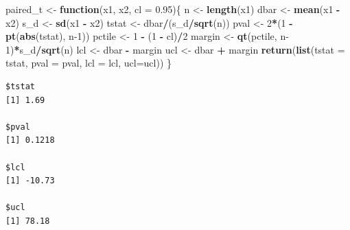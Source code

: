 \documentclass[
]{krantz}
\makeatletter
\newenvironment{Shaded}{\begin{snugshade}}{\end{snugshade}}
\newcommand{\ControlFlowTok}[1]{\textcolor[rgb]{0.27,0.27,0.27}{\textbf{#1}}}
\newcommand{\DataTypeTok}[1]{\textcolor[rgb]{0.27,0.27,0.27}{#1}}
\newcommand{\DecValTok}[1]{\textcolor[rgb]{0.06,0.06,0.06}{#1}}
\newcommand{\FloatTok}[1]{\textcolor[rgb]{0.06,0.06,0.06}{#1}}
\newcommand{\KeywordTok}[1]{\textcolor[rgb]{0.27,0.27,0.27}{\textbf{#1}}}
\newcommand{\NormalTok}[1]{#1}
\newcommand{\OperatorTok}[1]{\textcolor[rgb]{0.43,0.43,0.43}{\textbf{#1}}}
\newcommand{\StringTok}[1]{\textcolor[rgb]{0.5,0.5,0.5}{#1}}
\newenvironment{kframe}{%
\medskip{}
\setlength{\fboxsep}{.8em}
 \def\at@end@of@kframe{}%
 \ifinner\ifhmode%
  \def\at@end@of@kframe{\end{minipage}}%
  \begin{minipage}{\columnwidth}%
 \fi\fi%
 \def\FrameCommand##1{\hskip\@totalleftmargin \hskip-\fboxsep
 \colorbox{shadecolor}{##1}\hskip-\fboxsep
     \hskip-\linewidth \hskip-\@totalleftmargin \hskip\columnwidth}%
 \MakeFramed {\advance\hsize-\width
   \@totalleftmargin\z@ \linewidth\hsize
   \@setminipage}}%
 {\par\unskip\endMakeFramed%
 \at@end@of@kframe}
\renewenvironment{Shaded}{\begin{kframe}}{\end{kframe}}
\makeatother
\begin{document}
\begin{Shaded}
\begin{Highlighting}[]
\NormalTok{paired\_t \textless{}{-}}\StringTok{ }\ControlFlowTok{function}\NormalTok{(x1, x2, }\DataTypeTok{cl =} \FloatTok{0.95}\NormalTok{)\{}
\NormalTok{    n \textless{}{-}}\StringTok{ }\KeywordTok{length}\NormalTok{(x1)}
\NormalTok{    dbar \textless{}{-}}\StringTok{ }\KeywordTok{mean}\NormalTok{(x1 }\OperatorTok{{-}}\StringTok{ }\NormalTok{x2)}
\NormalTok{    s\_d \textless{}{-}}\StringTok{ }\KeywordTok{sd}\NormalTok{(x1 }\OperatorTok{{-}}\StringTok{ }\NormalTok{x2)}
\NormalTok{    tstat \textless{}{-}}\StringTok{ }\NormalTok{dbar}\OperatorTok{/}\NormalTok{(s\_d}\OperatorTok{/}\KeywordTok{sqrt}\NormalTok{(n))}
\NormalTok{    pval \textless{}{-}}\StringTok{ }\DecValTok{2}\OperatorTok{*}\NormalTok{(}\DecValTok{1} \OperatorTok{{-}}\StringTok{ }\KeywordTok{pt}\NormalTok{(}\KeywordTok{abs}\NormalTok{(tstat), n}\DecValTok{{-}1}\NormalTok{))}
\NormalTok{    pctile \textless{}{-}}\StringTok{ }\DecValTok{1} \OperatorTok{{-}}\StringTok{ }\NormalTok{(}\DecValTok{1} \OperatorTok{{-}}\StringTok{ }\NormalTok{cl)}\OperatorTok{/}\DecValTok{2}
\NormalTok{    margin \textless{}{-}}\StringTok{ }\KeywordTok{qt}\NormalTok{(pctile, n}\DecValTok{{-}1}\NormalTok{)}\OperatorTok{*}\NormalTok{s\_d}\OperatorTok{/}\KeywordTok{sqrt}\NormalTok{(n)}
\NormalTok{    lcl \textless{}{-}}\StringTok{ }\NormalTok{dbar }\OperatorTok{{-}}\StringTok{ }\NormalTok{margin}
\NormalTok{    ucl \textless{}{-}}\StringTok{ }\NormalTok{dbar }\OperatorTok{+}\StringTok{ }\NormalTok{margin}
    \KeywordTok{return}\NormalTok{(}\KeywordTok{list}\NormalTok{(}\DataTypeTok{tstat =}\NormalTok{ tstat, }\DataTypeTok{pval =}\NormalTok{ pval, }\DataTypeTok{lcl =}\NormalTok{ lcl, }\DataTypeTok{ucl=}\NormalTok{ucl))}
\NormalTok{\}}
\end{Highlighting}
\end{Shaded}

\begin{Shaded}
\end{Shaded}

\begin{verbatim}
$tstat
[1] 1.69

$pval
[1] 0.1218

$lcl
[1] -10.73

$ucl
[1] 78.18
\end{verbatim}
\end{document}
